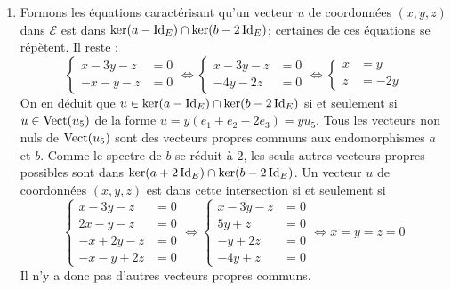 \begin{enumerate}
\item Formons les équations caractérisant qu'un vecteur $u$ de coordonnées $(x,y,z)$ dans $\mathcal{E}$ est dans $\ker(a-\operatorname{Id}_E)\cap \ker(b-2\operatorname{Id}_E)$; certaines de ces équations se répètent. Il reste :
\begin{displaymath}
\left\lbrace
\begin{aligned}
x-3y-z&=0 \\ -x-y-z &= 0  
\end{aligned}
\right.
\Leftrightarrow
\left\lbrace
\begin{aligned}
x-3y-z&=0 \\ -4y -2z &= 0 
\end{aligned}
\right.
\Leftrightarrow
\left\lbrace
\begin{aligned}
x&=y \\ z &= -2y 
\end{aligned}
\right.
\end{displaymath}
On en déduit que $u\in\ker(a-\operatorname{Id}_E)\cap \ker(b-2\operatorname{Id}_E)$ si et seulement si $u\in \operatorname{Vect}(u_5)$ de la forme $u=y(e_1+e_2-2e_3)=yu_5$.\newline
Tous les vecteurs non nuls de $\operatorname{Vect}(u_5)$ sont des vecteurs propres communs aux endomorphismes $a$ et $b$.\newline
Comme le spectre de $b$ se réduit à $2$, les seuls autres vecteurs propres possibles sont dans $\ker(a+2\operatorname{Id}_E)\cap \ker(b-2\operatorname{Id}_E)$. Un vecteur $u$ de coordonnées $(x,y,z)$ est dans cette intersection si et seulement si
\begin{displaymath}
\left\lbrace 
\begin{aligned}
x-3y-z&=0 \\ 2x -y -z &=0 \\ -x+2y-z&=0 \\ -x-y+2z &=0 
\end{aligned} 
\right.
\Leftrightarrow
\left\lbrace 
\begin{aligned}
x-3y-z&=0 \\ 5y +z &=0 \\ -y+2z&=0 \\ -4y+z &=0 
\end{aligned} 
\right.
\Leftrightarrow x= y=z=0
\end{displaymath}
Il n'y a donc pas d'autres vecteurs propres communs.
\end{enumerate}


